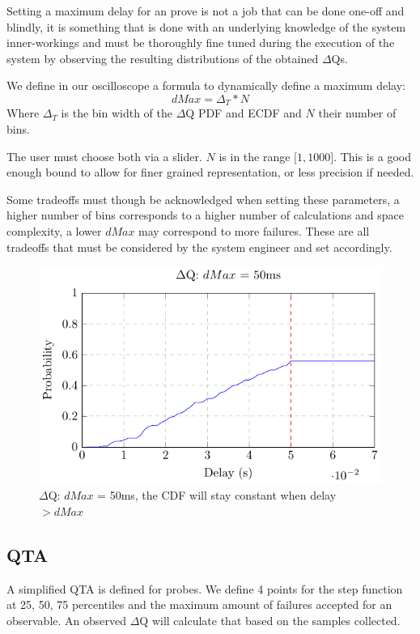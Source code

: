 Setting a maximum delay for an prove is not a job that can be done one-off and blindly, it is something that is done with an underlying knowledge of the system inner-workings and must be thoroughly fine tuned during the execution of the system by observing the resulting distributions of the obtained $\Delta$Qs. 

We define in our oscilloscope a formula to dynamically define a maximum delay:
\begin{equation}
    dMax = \Delta_{T} * N  
    \label{eq:dMaxU}
\end{equation}
Where $\Delta_{T}$ is the bin width of the $\Delta$Q PDF and ECDF and $N$ their number of bins.

The user must choose both via a slider. $N$ is in the range $\lbrack 1, 1000 \rbrack$. This is a good enough bound to allow for finer grained representation, or less precision if needed. 

Some tradeoffs must though be acknowledged when setting these parameters, a higher number of bins corresponds to a higher number of calculations and space complexity, a lower $dMax$ may correspond to more failures. These are all tradeoffs that must be considered by the system engineer and set accordingly.
    \begin{figure}[H]
        \begin{center}
            \includegraphics[scale = 1]{tikz/cdf_dmax.pdf}
        \end{center}
        \caption{$\Delta$Q: $dMax$ = 50ms, the CDF will stay constant when delay $> dMax$}
    \end{figure}

    \subsection{QTA}
        A simplified QTA is defined for probes. We define 4 points for the step function at 25, 50, 75 percentiles and the maximum amount of failures accepted for an observable. An observed $\Delta$Q will calculate that based on the samples collected. 

